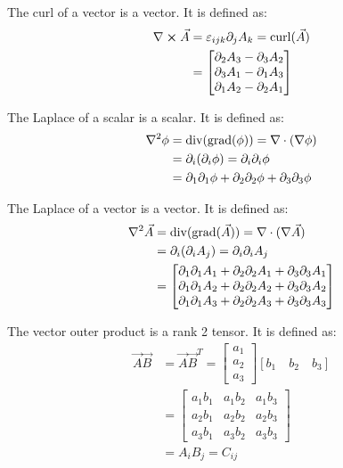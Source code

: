 The curl of a vector is a vector. It is defined as:
\begin{align*}
    \nabla \cross \vec{A} &= \varepsilon_{ijk}\partial_{j} A_k = \operatorname{curl}(\vec{A}) \\
    &= \begin{bmatrix}
        \partial_{2} A_3 - \partial_{3} A_2 \\
        \partial_{3} A_1 - \partial_{1} A_3 \\
        \partial_{1} A_2 - \partial_{2} A_1
    \end{bmatrix}
\end{align*}

The Laplace of a scalar is a scalar. It is defined as:
\begin{align*}
    \nabla^2 \phi &= \operatorname{div}(\operatorname{grad}(\phi)) = \nabla \cdot (\nabla \phi) \\
    &= \partial_{i} (\partial_{i} \phi)  = \partial_{i} \partial_{i} \phi \\
    &= \partial_{1} \partial_{1} \phi + \partial_{2} \partial_{2} \phi + \partial_{3} \partial_{3} \phi
\end{align*}

The Laplace of a vector is a vector. It is defined as:
\begin{align*}
    \nabla^2 \vec{A} &= \operatorname{div}(\operatorname{grad}(\vec{A})) = \nabla \cdot (\nabla \vec{A}) \\
    &= \partial_{i} (\partial_{i} A_j)  = \partial_{i} \partial_{i} A_j \\
    &= \begin{bmatrix}
        \partial_{1} \partial_{1} A_1 + \partial_{2} \partial_{2} A_1 + \partial_{3} \partial_{3} A_1 \\
        \partial_{1} \partial_{1} A_2 + \partial_{2} \partial_{2} A_2 + \partial_{3} \partial_{3} A_2 \\
        \partial_{1} \partial_{1} A_3 + \partial_{2} \partial_{2} A_3 + \partial_{3} \partial_{3} A_3
    \end{bmatrix}
\end{align*}

The vector outer product is a rank 2 tensor. It is defined as:
\begin{align*}
    \vec{A} \vec{B} &= \vec{A} \vec{B}^T  = \begin{bmatrix} a_1 \\ a_2 \\ a_3 \end{bmatrix} [b_1 \quad b_2 \quad b_3] \\
    &= \begin{bmatrix}
        a_1 b_1 & a_1 b_2 & a_1 b_3 \\
        a_2 b_1 & a_2 b_2 & a_2 b_3 \\
        a_3 b_1 & a_3 b_2 & a_3 b_3
    \end{bmatrix} \\
    &= A_i B_j = C_{ij}
\end{align*}

